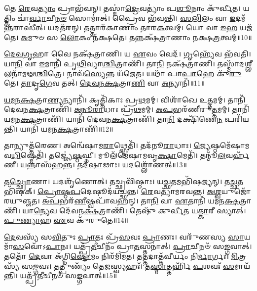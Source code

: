 𑌤𑍇 \ul{𑌰𑍇}\-𑌵\-\ul{𑌤𑍍𑌯𑌾𑌂} 𑌪𑍍𑌰𑌾𑌭᳴𑌵𑌨𑍍।
𑌤𑌸𑍍𑌮𑌾॑\-\ul{𑌦𑍍𑌰𑍇}\-𑌵𑌤𑍍𑌯𑌾𑌂॑ 𑌪\-\ul{𑌶𑍂}\-𑌨𑌾𑌂 𑌕𑍁᳴𑌰𑍍𑌵𑍀𑌤।
𑌯𑌤𑍍𑌕𑌿𑌂 𑌚𑌾॑\-\ul{𑌰𑍍𑌵𑌾}\-𑌚𑍀\-\ul{𑌨}\-\-\ul{𑍞} 𑌸𑍋𑌮𑌾॑𑌤𑍍।
𑌪𑍍𑌰𑍈𑌵 𑌭᳴𑌵𑌨𑍍𑌤𑌿।
\-\ul{𑌸}\-\-\ul{𑌲𑌿}\-𑌲𑌂 𑌵𑌾 \ul{𑌇}\-𑌦𑌮᳴\-\ul{𑌨𑍍𑌤}\-𑌰𑌾𑌸𑍀॑𑌤𑍍।
𑌯𑌦𑌤᳴𑌰𑌨𑍍।
𑌤𑌤𑍍𑌤𑌾𑌰᳴𑌕𑌾𑌣𑌾𑌂 𑌤𑌾𑌰\-\ul{𑌕}\-𑌤𑍍𑌵𑌮𑍍।
𑌯𑍋 𑌵𑌾 \ul{𑌇}\-𑌹 𑌯𑌜᳴𑌤𑍇।
\-\ul{𑌅}\-𑌮𑍁𑍞 𑌸 \ul{𑌲𑍋}\-𑌕𑌂 𑌨᳴𑌕𑍍𑌷𑌤𑍇।
𑌤𑌨𑍍𑌨𑌕𑍍𑌷᳴𑌤𑍍𑌰𑌾𑌣𑌾𑌂 𑌨𑌕𑍍𑌷\-\ul{𑌤𑍍𑌰}\-𑌤𑍍𑌵𑌮𑍍॥10॥

\-\ul{𑌦𑍇}\-\-\ul{𑌵}\-\-\ul{𑌗𑍃}\-𑌹𑌾 𑌵𑍈 𑌨𑌕𑍍𑌷᳴𑌤𑍍𑌰𑌾𑌣𑌿।
𑌯 \ul{𑌏}\-𑌵𑌂 𑌵𑍇𑌦᳴।
\-\ul{𑌗𑍃}\-𑌹𑍍𑌯𑍇᳴𑌵 𑌭᳴𑌵𑌤𑌿।
𑌯𑌾\-\ul{𑌨𑌿} 𑌵𑌾 \ul{𑌇}\-𑌮𑌾𑌨𑌿᳴ 𑌪𑍃\-\ul{𑌥𑌿}\-𑌵𑍍𑌯𑌾\-\ul{𑌶𑍍𑌚𑌿}\-𑌤𑍍𑌰𑌾𑌣𑌿᳴।
𑌤𑌾\-\ul{𑌨𑌿} 𑌨𑌕𑍍𑌷᳴𑌤𑍍𑌰𑌾𑌣𑌿।
𑌤𑌸𑍍𑌮𑌾᳴𑌦\-\ul{𑌶𑍍𑌲𑍀}\-𑌲𑌨𑌾᳴𑌮𑍟\-\ul{𑌶𑍍𑌚𑌿}\-𑌤𑍍𑌰𑍇।
𑌨𑌾𑌵᳴\-\ul{𑌸𑍍𑌯𑍇}\-𑌨𑍍𑌨 𑌯᳴𑌜𑍇𑌤।
𑌯𑌥𑌾᳴ 𑌪𑌾\-\ul{𑌪𑌾}\-𑌹𑍇 𑌕𑍁᳴\-\ul{𑌰𑍁}\-𑌤𑍇।
\-\ul{𑌤𑌾}\-𑌦𑍃\-\ul{𑌗𑍇}\-𑌵 𑌤𑌤𑍍।
\-\ul{𑌦𑍇}\-\-\ul{𑌵}\-\-\ul{𑌨}\-\-\ul{𑌕𑍍𑌷}\-𑌤𑍍𑌰𑌾\-\ul{𑌣𑌿} 𑌵𑌾 \ul{𑌅}\-𑌨𑍍𑌯𑌾𑌨𑌿᳴॥11॥

\-\ul{𑌯}\-\-\ul{𑌮}\-\-\ul{𑌨}\-\-\ul{𑌕𑍍𑌷}\-𑌤𑍍𑌰𑌾\-\ul{𑌣𑍍𑌯}\-𑌨𑍍𑌯𑌾𑌨𑌿᳴।
𑌕𑍃𑌤𑍍𑌤𑌿᳴𑌕𑌾𑌃 𑌪𑍍𑌰\-\ul{𑌥}\-𑌮𑌮𑍍।
𑌵𑌿𑌶𑌾᳴𑌖𑍇 𑌉\-\ul{𑌤𑍍𑌤}\-𑌮𑌮𑍍।
𑌤𑌾𑌨𑌿᳴ 𑌦𑍇𑌵𑌨\-\ul{𑌕𑍍𑌷}\-𑌤𑍍𑌰𑌾𑌣𑌿᳴।
\-\ul{𑌅}\-\-\ul{𑌨𑍂}\-\-\ul{𑌰𑌾}\-𑌧𑌾𑌃 𑌪𑍍𑌰᳴\-\ul{𑌥}\-𑌮𑌮𑍍।
\-\ul{𑌅}\-\-\ul{𑌪}\-𑌭𑌰᳴𑌣𑍀𑌰𑍁\-\ul{𑌤𑍍𑌤}\-𑌮𑌮𑍍।
𑌤𑌾𑌨𑌿᳴ 𑌯𑌮𑌨\-\ul{𑌕𑍍𑌷}\-𑌤𑍍𑌰𑌾𑌣𑌿᳴।
𑌯𑌾𑌨𑌿᳴ 𑌦𑍇𑌵𑌨\-\ul{𑌕𑍍𑌷}\-𑌤𑍍𑌰𑌾𑌣𑌿᳴।
𑌤𑌾\-\ul{𑌨𑌿} 𑌦𑌕𑍍𑌷𑌿᳴𑌣𑍇\-\ul{𑌨} 𑌪𑌰𑌿᳴𑌯𑌨𑍍𑌤𑌿।
𑌯𑌾𑌨𑌿᳴ 𑌯𑌮𑌨\-\ul{𑌕𑍍𑌷}\-𑌤𑍍𑌰𑌾𑌣𑌿᳴॥12॥

𑌤𑌾𑌨𑍍𑌯𑍁𑌤𑍍𑌤᳴𑌰𑍇𑌣।
𑌅𑌨𑍍𑌵𑍇᳴𑌷𑌾𑌮\-\ul{𑌰𑌾}\-𑌥𑍍𑌸𑍍𑌮𑍇𑌤𑌿᳴।
𑌤𑌦᳴𑌨𑍂\-\ul{𑌰𑌾}\-𑌧𑌾𑌃।
\-\ul{𑌜𑍍𑌯𑍇}\-𑌷𑍍𑌠𑌮𑍇᳴𑌷𑌾𑌮\-𑌵\-\ul{𑌧𑌿}\-𑌷𑍍𑌮𑍇𑌤𑌿᳴।
𑌤𑌜𑍍𑌜𑍍𑌯𑍇॑\-\ul{𑌷𑍍𑌠}\-𑌘𑍍𑌨𑍀।
𑌮𑍂𑌲᳴𑌮𑍇𑌷𑌾𑌮𑌵𑍃\-\ul{𑌕𑍍𑌷𑌾}\-𑌮𑍇𑌤𑌿᳴।
𑌤𑌨𑍍𑌮𑍂᳴\-\ul{𑌲}\-𑌵𑌰𑍍\mbox{}𑌹᳴𑌣𑍀।
𑌯𑌨𑍍𑌨𑌾𑌸᳴𑌹𑌨𑍍𑌤।
𑌤𑌦᳴\-\ul{𑌷𑌾}\-𑌢𑌾𑌃।
𑌯𑌦𑌶𑍍𑌲𑍋᳴𑌣𑌤𑍍॥13॥

𑌤\-\ul{𑌚𑍍𑌛𑍍𑌰𑍋}\-𑌣𑌾।
𑌯𑌦𑌶𑍃᳴𑌣𑍋𑌤𑍍।
𑌤𑌚𑍍𑌛𑍍𑌰𑌵𑌿᳴𑌷𑍍𑌠𑌾𑌃।
𑌯\-\ul{𑌚𑍍𑌛}\-𑌤𑌮𑌭𑌿᳴𑌷𑌜𑍍𑌯𑌨𑍍।
𑌤\-\ul{𑌚𑍍𑌛}\-𑌤𑌭𑌿᳴𑌷𑌕𑍍।
\-\ul{𑌪𑍍𑌰𑍋}\-\-\ul{𑌷𑍍𑌠}\-\-\ul{𑌪}\-𑌦𑍇𑌷𑍂𑌦᳴𑌯𑌚𑍍𑌛𑌨𑍍𑌤।
\-\ul{𑌰𑍇}\-𑌵𑌤𑍍𑌯𑌾᳴𑌮𑌰𑌵𑌨𑍍𑌤।
\-\ul{𑌅}\-\-\ul{𑌶𑍍𑌵}\-𑌯𑍁𑌜𑍋᳴𑌰\-𑌯𑍁𑌞𑍍𑌜𑌤।
\-\ul{𑌅}\-\-\ul{𑌪}\-𑌭𑌰᳴\-\ul{𑌣𑍀}\-𑌷𑍍𑌵𑌪𑌾᳴𑌵𑌹𑌨𑍍।
𑌤𑌾\-\ul{𑌨𑌿} 𑌵𑌾 \ul{𑌏}\-𑌤𑌾𑌨𑌿᳴ 𑌯𑌮𑌨\-\ul{𑌕𑍍𑌷}\-𑌤𑍍𑌰𑌾𑌣𑌿᳴।
𑌯𑌾\-\ul{𑌨𑍍𑌯𑍇}\-𑌵 𑌦𑍇᳴𑌵𑌨\-\ul{𑌕𑍍𑌷}\-𑌤𑍍𑌰𑌾𑌣𑌿᳴।
𑌤𑍇𑌷𑍁᳴ 𑌕𑍁𑌰𑍍𑌵𑍀𑌤 𑌯\-\ul{𑌤𑍍𑌕𑌾}\-𑌰𑍀 𑌸𑍍𑌯𑌾𑌤𑍍।
\-\ul{𑌪𑍁}\-\-\ul{𑌣𑍍𑌯𑌾}\-𑌹 \ul{𑌏}\-𑌵 𑌕𑍁᳴𑌰𑍁𑌤𑍇॥14॥

\-\ul{𑌦𑍇}\-𑌵𑌸𑍍𑌯᳴ 𑌸\-\ul{𑌵𑌿}\-𑌤𑍁𑌃 \ul{𑌪𑍍𑌰𑌾}\-𑌤𑌃 𑌪𑍍𑌰᳴\-\ul{𑌸}\-𑌵𑌃 \ul{𑌪𑍍𑌰𑌾}\-𑌣𑌃।
𑌵𑌰𑍁᳴𑌣𑌸𑍍𑌯 \ul{𑌸𑌾}\-𑌯𑌮𑌾᳴\-\ul{𑌸}\-𑌵𑍋᳴\-𑌽\-\ul{𑌪𑌾}\-𑌨𑌃।
𑌯𑌤𑍍𑌪𑍍𑌰᳴\-\ul{𑌤𑍀}\-𑌚𑍀𑌨𑌂᳴ 𑌪𑍍𑌰𑌾\-\ul{𑌤}\-𑌸𑍍𑌤𑌨𑌾॑𑌤𑍍।
\-\ul{𑌪𑍍𑌰𑌾}\-𑌚𑍀𑌨𑍞᳴ 𑌸\-\ul{𑌙𑍍𑌗}\-𑌵𑌾𑌤𑍍।
𑌤𑌤𑍋᳴ \ul{𑌦𑍇}\-𑌵𑌾 𑌅᳴𑌗𑍍𑌨𑌿\-\ul{𑌷𑍍𑌟𑍋}\-𑌮𑌂 𑌨𑌿𑌰᳴𑌮𑌿𑌮𑌤।
𑌤𑌤𑍍𑌤𑌦𑌾𑌤𑍍𑌤᳴𑌵𑍀𑌰𑍍𑌯𑌂 𑌨𑌿\-\ul{𑌰𑍍𑌮𑌾}\-𑌰𑍍𑌗𑌃।
\-\ul{𑌮𑌿}\-𑌤𑍍𑌰𑌸𑍍𑌯᳴ 𑌸\-\ul{𑌙𑍍𑌗}\-𑌵𑌃।
𑌤𑌤𑍍𑌪𑍁𑌣𑍍𑌯𑌂᳴ 𑌤𑍇\-\ul{𑌜}\-𑌸𑍍𑌵𑍍𑌯𑌹𑌃᳴।
𑌤\-\ul{𑌸𑍍𑌮𑌾}\-𑌤𑍍𑌤𑌰𑍍\mbox{}𑌹𑌿᳴ \ul{𑌪}\-𑌶𑌵𑌃᳴ \ul{𑌸}\-𑌮𑌾𑌯᳴𑌨𑍍𑌤𑌿।
𑌯𑌤𑍍𑌪𑍍𑌰᳴\-\ul{𑌤𑍀}\-𑌚𑍀𑌨𑍞᳴ 𑌸\-\ul{𑌙𑍍𑌗}\-𑌵𑌾𑌤𑍍॥15॥

